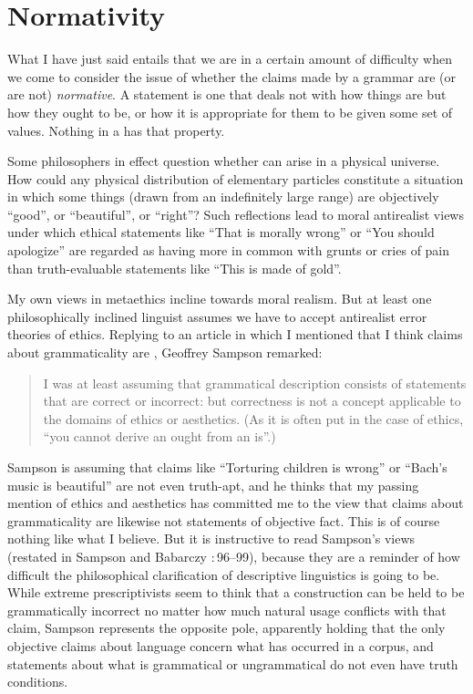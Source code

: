 \documentclass[output=paper]{langscibook}
\begin{document}
\section{Normativity}
\label{sec:pullum:normativity}

What I have just said entails that we are in a certain amount of difficulty when we come to consider the issue of whether the claims made by a grammar are (or are not) \emph{normative}.  A  statement is one that deals not with how things are but how they ought to be, or how it is appropriate for them to be given some set of values. Nothing in a  has that property.

Some philosophers in effect question whether  can arise in a physical universe. How could any physical distribution of elementary particles constitute a situation in which some things (drawn from an indefinitely large range) are objectively ``good'', or ``beautiful'', or ``right''? Such reflections lead to moral antirealist views under which ethical statements like ``That is morally wrong'' or ``You should apologize'' are regarded as having more in common with grunts or cries of pain than truth-evaluable statements like ``This is made of gold''.

My own views in metaethics incline towards moral realism. But at least one philosophically inclined linguist assumes we have to accept antirealist error theories of ethics. Replying to an article in which I mentioned that I think claims about grammaticality are  \citep{Pullum07}, Geoffrey Sampson remarked:

\begin{quote}
I was at least assuming that grammatical description consists of statements that are correct or incorrect: but correctness is not a concept applicable to the domains of ethics or aesthetics. (As it is often put in the case of ethics, ``you cannot derive an ought from an is''.)
\citep[112]{Sampson07reply}
\end{quote}

Sampson is assuming that claims like ``Torturing children is wrong'' or ``Bach's music is beautiful'' are not even truth-apt, and he thinks that my passing mention of ethics and aesthetics has committed me to the view that claims about grammaticality are likewise not statements of objective fact.  This is of course nothing like what I believe.  But it is instructive to read Sampson's views (restated in Sampson and Babarczy \citeyear{SampBaba14}:\,96--99), because they are a reminder of how difficult the philosophical clarification of descriptive linguistics is going to be. While extreme prescriptivists seem to think that a construction can be held to be grammatically incorrect no matter how much natural usage conflicts with that claim, Sampson represents the opposite pole, apparently holding that the only objective claims about language concern what has occurred in a corpus, and statements about what is grammatical or ungrammatical do not even have truth conditions.
\end{document}
